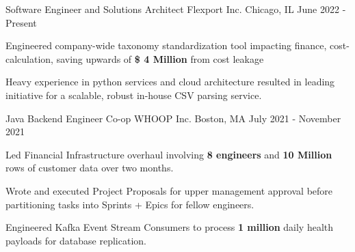 

\begin{cventries}

\cventry
    {Software Engineer and Solutions Architect} %
    {Flexport Inc.} %
    {Chicago, IL} %
    {June 2022 - Present} %
    {
      \begin{cvitems} %
        \item {Engineered company-wide taxonomy standardization tool impacting finance, cost-calculation, saving upwards of \textbf{\$ 4 Million} from cost leakage }
        \item { Heavy experience in python services and cloud architecture resulted in leading initiative for a scalable, robust in-house CSV parsing service. }
      \end{cvitems}
    }

  \cventry
    {Java Backend Engineer Co-op} %
    {WHOOP Inc.} %
    {Boston, MA} %
    {July 2021 - November 2021} %
    {
      \begin{cvitems} %
        \item {Led Financial Infrastructure overhaul involving \textbf{8 engineers} and \textbf{10 Million} rows of customer data over two months.}
        \item { Wrote and executed Project Proposals for upper management approval before partitioning tasks into Sprints + Epics for fellow engineers.}
        \item {Engineered Kafka Event Stream Consumers to process \textbf{1 million} daily health payloads for database replication.}
      \end{cvitems}
    }
    

\end{cventries}
